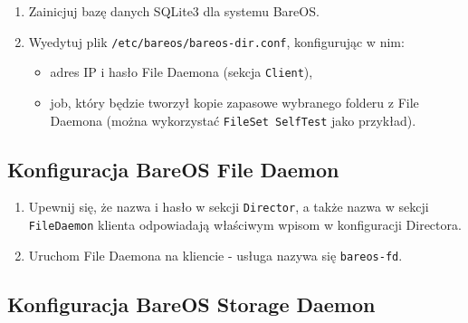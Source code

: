 \documentclass[polish]{article}
\begin{document}
\begin{enumerate}

\item Zainicjuj bazę danych SQLite3 dla systemu BareOS.

\item Wyedytuj plik \texttt{/etc/bareos/bareos-dir.conf}, konfigurując w nim:
\begin{itemize}
\item adres IP i hasło File Daemona (sekcja \texttt{Client}),
\item job, który będzie tworzył kopie zapasowe wybranego folderu z File Daemona (można wykorzystać \texttt{FileSet SelfTest} jako przykład).
\end{itemize}

\end{enumerate}


\subsection*{Konfiguracja BareOS File Daemon}

\begin{enumerate}

\item Upewnij się, że nazwa i hasło w sekcji \texttt{Director}, a także nazwa w sekcji \texttt{FileDaemon} klienta odpowiadają właściwym wpisom w konfiguracji Directora.

\item Uruchom File Daemona na kliencie - usługa nazywa się \texttt{bareos-fd}.

\end{enumerate}


\subsection*{Konfiguracja BareOS Storage Daemon}
\end{document}
